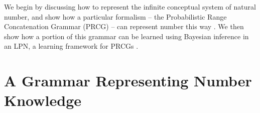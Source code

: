 \documentclass[10pt,letterpaper]{article}
\begin{document}
We begin by discussing how to represent the infinite conceptual system
of natural number, and show how a particular formalism -- the
Probabilistic Range Concatenation Grammar (PRCG) -- can represent
number this way \citep{boullier2005range}. We then show how a portion
of this grammar can be learned using Bayesian inference in an LPN, a
learning framework for PRCGs \citep{DecRulTen2015}.

\section{A Grammar Representing Number Knowledge}

\end{document}

